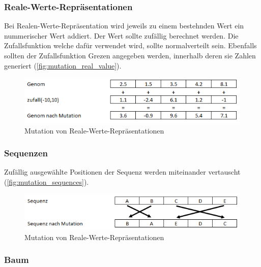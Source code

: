       \subsubsection{Reale-Werte-Repräsentationen}

        Bei Realen-Werte-Repräsentation wird jeweils zu einem bestehnden Wert ein nummerischer Wert addiert.
        Der Wert sollte zufällig berechnet werden. Die Zufallsfunktion welche dafür verwendet wird, sollte normalverteilt sein.
        Ebenfalls sollten der Zufallsfunktion Grezen angegeben werden, innerhalb deren sie Zahlen generiert (\vref{fig:mutation_real_value}).

        \begin{figure}[H]
          \includegraphics[scale=1, center]{graphics/mutation_real_value}
          \caption{Mutation von Reale-Werte-Repräsentationen\label{fig:mutation_real_value}}
        \end{figure}

      \subsubsection{Sequenzen}

        Zufällig ausgewählte Positionen der Sequenz werden miteinander vertauscht (\vref{fig:mutation_sequences}).

        \begin{figure}[H]
            \includegraphics[scale=1, center]{graphics/mutation_sequences}
            \caption{Mutation von Reale-Werte-Repräsentationen\label{fig:mutation_sequences}}
        \end{figure}

      \subsubsection{Baum}

